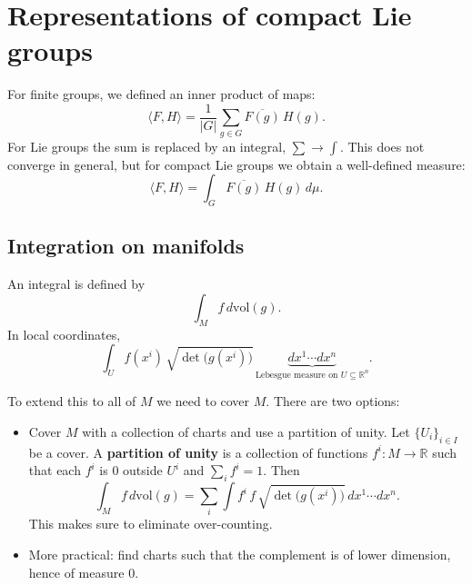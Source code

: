 \chapter{Representations of compact Lie groups}

For finite groups, we defined an inner product of maps:
\[
    \langle F, H \rangle = \frac{1}{|G|} \sum_{g \in G} \overline{F(g)}\, H(g).
\]
For Lie groups the sum is replaced by an integral, $\sum \to \int$. This does not converge in
general, but for compact Lie groups we obtain a well-defined measure:
\[
    \langle F, H \rangle = \int_G \overline{F(g)}\, H(g)\, d\mu.
\]

\section{Integration on manifolds}


An integral is defined by
\[
    \int_M f\, d\mathrm{vol}(g).
\]
In local coordinates,
\[
    \int_U f(x^i)\, \sqrt{\det\big(g(x^i)\big)}\,
        \underbrace{dx^1 \cdots dx^n}_{\text{Lebesgue measure on } U \subseteq \mathbb{R}^n}.
\]

To extend this to all of $M$ we need to cover $M$. There are two options:
\begin{itemize}
    \item Cover $M$ with a collection of charts and use a partition of unity. Let
    $\{U_i\}_{i \in I}$ be a cover. A \textbf{partition of unity} is a collection of functions
    $f^i : M \to \mathbb{R}$ such that each $f^i$ is $0$ outside $U^i$ and $\sum_i f^i = 1$. Then
    \[
        \int_M f\, d\mathrm{vol}(g) = \sum_i \int f^i\, f\, \sqrt{\det\big(g(x^i)\big)}\, dx^1 \cdots dx^n.
    \]
    This makes sure to eliminate over-counting.

    \item More practical: find charts such that the complement is of lower dimension, hence of
    measure $0$.
\end{itemize}

